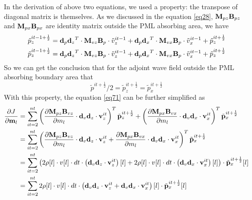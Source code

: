 \documentclass[revised,endfloat]{geophysics}
\begin{document}
In the derivation of above two equations, we used a property: the transpose of diagonal matrix is themselves. 
As we discussed in the equation \ref{eq28}, ${\bf M}_{pz}{\bf B}_{pz}$ and ${\bf M}_{px}{\bf B}_{px}$ are identity matrix outside the PML absorbing area, we have
\begin{equation}
\begin{split}
\tilde{p}_z^{it-1+\frac{1}{2}} = {{\bf d}_p{\bf d}_z}^T \cdot {{\bf M}_{vz}{\bf B}_{p}} \cdot \tilde{v}_z^{it-1} +  {{\bf d}_p{\bf d}_x}^T \cdot {{\bf M}_{vx}{\bf B}_{p}} \cdot \tilde{v}_x^{it-1} + \tilde{p}_z^{it+\frac{1}{2}} \\  
\tilde{p}_z^{it-1+\frac{1}{2}} = {{\bf d}_p{\bf d}_z}^T \cdot {{\bf M}_{vz}{\bf B}_{p}} \cdot \tilde{v}_z^{it-1}+  {{\bf d}_p{\bf d}_x}^T \cdot {{\bf M}_{vx}{\bf B}_{p}} \cdot \tilde{v}_x^{it-1} + \tilde{p}_z^{it+\frac{1}{2}} \\  
\end{split}
\label{eq75}
\end{equation}
So we can get the conclusion that for the adjoint wave field outside the PML absorbing boundary area that
\begin{equation}
\tilde{p}^{it+\frac{1}{2}}/2  = \tilde{p}_z^{it+\frac{1}{2}} = \tilde{p}_x^{it+\frac{1}{2}}
\label{eq76}
\end{equation}
With this property, the equation \ref{eq71} can be further simplified as
\begin{equation}
\begin{split}
\frac{\partial J}{{\partial \bf m}_l} &= \sum_{it=2}^{nt} \left( \frac{{\partial \bf M}_{pz}{\bf B}_{vz}}{\partial m_l} \cdot {\bf d}_v{\bf d}_z \cdot {\bf v}_z^{it} \right)^T \tilde{{\bf p}}_z^{it+\frac{1}{2}} +  \left( \frac{{\partial \bf M}_{px}{\bf B}_{vx}}{\partial m_l} \cdot {\bf d}_v{\bf d}_x \cdot {\bf v}_x^{it} \right)^T \tilde{{\bf p}}_x^{it+\frac{1}{2}} \\
&= \sum_{it=2}^{nt} \left( \frac{{\partial \bf M}_{pz}{\bf B}_{vz}}{\partial m_l} \cdot {\bf d}_v{\bf d}_z \cdot {\bf v}_z^{it} +  \frac{{\partial \bf M}_{px}{\bf B}_{vx}}{\partial m_l} \cdot {\bf d}_v{\bf d}_x \cdot {\bf v}_x^{it} \right)^T \tilde{{\bf p}}_x^{it+\frac{1}{2}}  \\
&=\sum_{it=2}^{nt} \left( 2\rho[l]\cdot v[l] \cdot dt \cdot \left( {\bf d}_v{\bf d}_z \cdot {\bf v}_z^{it}\right)[l] +  2\rho[l]\cdot v[l] \cdot dt \cdot \left( {\bf d}_v{\bf d}_x \cdot {\bf v}_x^{it} \right)[l] \right) \cdot \tilde{{\bf p}}_x^{it+\frac{1}{2}} [l]\\
&=\sum_{it=2}^{nt} 2\rho[l]\cdot v[l] \cdot dt \cdot \left( {\bf d}_v{\bf d}_z \cdot {\bf v}_z^{it}+  {\bf d}_v{\bf d}_x \cdot {\bf v}_x^{it} \right)[l] \cdot \tilde{{\bf p}}_x^{it+\frac{1}{2}} [l] \\
\end{split}
\label{eq77}
\end{equation}
\end{document}
